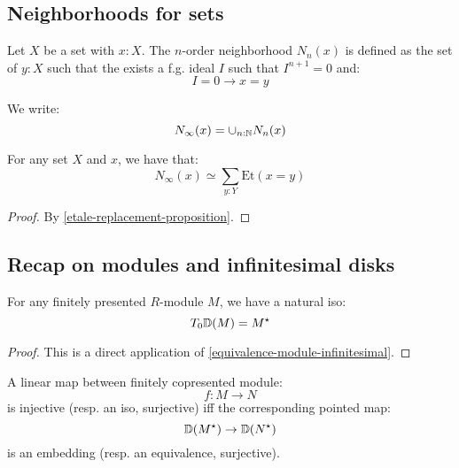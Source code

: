 \subsection{Neighborhoods for sets}

\begin{definition}
Let $X$ be a set with $x:X$. The $n$-order neighborhood $N_n(x)$ is defined as the set of $y:X$ such that the exists a f.g. ideal $I$ such that $I^{n+1}=0$ and:
\[I=0 \to x=y\]
\end{definition}

We write:
\[N_\infty(x) = \cup_{n:\mathbb{N}} N_n(x)\]

\begin{lemma}
For any set $X$ and $x$, we have that:
\[N_\infty(x) \simeq \sum_{y:Y} \mathrm{Et}(x=y)\]
\end{lemma}

\begin{proof}
By \cref{etale-replacement-proposition}.
\end{proof}


\subsection{Recap on modules and infinitesimal disks}

\begin{lemma}\label{tangent-infinitesimal-disks}
For any finitely presented $R$-module $M$, we have a natural iso:
\[T_0\mathbb{D}(M) = M^\star\]
\end{lemma}

\begin{proof}
This is a direct application of \cref{equivalence-module-infinitesimal}.
\end{proof}

\begin{lemma}\label{neighborhood-tangent-correspondence}
A linear map between finitely copresented module:
\[f:M\to N\]
is injective (resp. an iso, surjective) iff the corresponding pointed map:
\[\mathbb{D}(M^\star) \to \mathbb{D}(N^\star)\]
is an embedding (resp. an equivalence, surjective).
\end{lemma}

